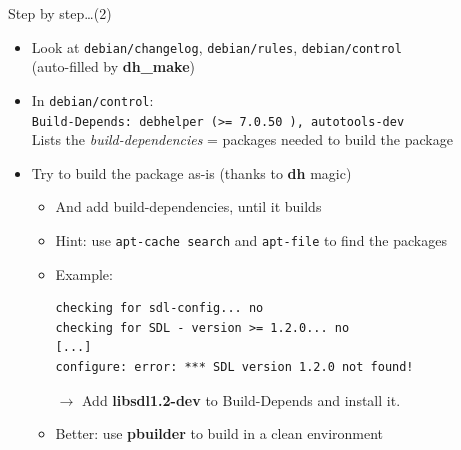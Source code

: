 \documentclass[10pt,final]{beamer}
\begin{document}
\begin{frame}[fragile=singleslide]{Step by step\ldots (2)}
\begin{itemize}
	\item Look at \texttt{debian/changelog}, \texttt{debian/rules}, \texttt{debian/control}\\
		(auto-filled by \textbf{dh\_make})
		\hbr
	\item In \texttt{debian/control}:\\
		\texttt{Build-Depends: debhelper (>= 7.0.50~), autotools-dev}\\
		Lists the \textsl{build-dependencies} = packages needed to build the package
		\hbr
	\item Try to build the package as-is (thanks to \textbf{dh} magic)
		\begin{itemize}
			\item And add build-dependencies, until it builds
			\item Hint: use \texttt{apt-cache search} and \texttt{apt-file} to find the packages
			\item Example:
\begin{lstlisting}[basicstyle=\ttfamily\footnotesize]
checking for sdl-config... no
checking for SDL - version >= 1.2.0... no
[...]
configure: error: *** SDL version 1.2.0 not found!
\end{lstlisting}
$\rightarrow$ Add \textbf{libsdl1.2-dev} to Build-Depends and install it.
		\hbr
	\item Better: use \textbf{pbuilder} to build in a clean environment
		\end{itemize}
\end{itemize}
\end{frame}
\end{document}
